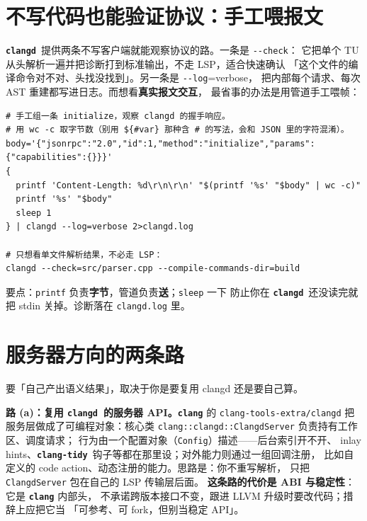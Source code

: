 \documentclass[12pt,a4paper,fontset=fandol]{ctexbook}
\newcommand{\Opt}[1]{\texttt{-\/-#1}}
\newcommand{\Lib}[1]{\textbf{\texttt{#1}}}
\newcommand{\Tidy}{\Lib{clang-tidy}}
\newcommand{\CD}{\Lib{clangd}}
\begin{document}
\section{不写代码也能验证协议：手工喂报文}\label{sec:ch08-s2}

\CD\ 提供两条不写客户端就能观察协议的路。一条是 \Opt{check}：
它把单个 TU 从头解析一遍并把诊断打到标准输出，不走 LSP，适合快速确认
「这个文件的编译命令对不对、头找没找到」。另一条是 \Opt{log}=verbose，
把内部每个请求、每次 AST 重建都写进日志。而想看\textbf{真实报文交互}，
最省事的办法是用管道手工喂帧：

\begin{lstlisting}[style=shellstyle,caption={用 printf 造 Content-Length 头，从管道喂一条 initialize 给 clangd},label={lst:ch08-pipe}]
# 手工组一条 initialize，观察 clangd 的握手响应。
# 用 wc -c 取字节数（别用 ${#var} 那种含 # 的写法，会和 JSON 里的字符混淆）。
body='{"jsonrpc":"2.0","id":1,"method":"initialize","params":{"capabilities":{}}}'
{
  printf 'Content-Length: %d\r\n\r\n' "$(printf '%s' "$body" | wc -c)"
  printf '%s' "$body"
  sleep 1
} | clangd --log=verbose 2>clangd.log

# 只想看单文件解析结果，不必走 LSP：
clangd --check=src/parser.cpp --compile-commands-dir=build
\end{lstlisting}

要点：\texttt{printf} 负责\textbf{字节}，管道负责\textbf{送}；\texttt{sleep} 一下
防止你在 \CD\ 还没读完就把 stdin 关掉。诊断落在 \texttt{clangd.log} 里。

\section{服务器方向的两条路}\label{sec:ch08-s3}

要「自己产出语义结果」，取决于你是要复用 clangd 还是要自己算。

\textbf{路 (a)：复用 \CD\ 的服务器 API。}\Lib{clang} 的
\texttt{clang-tools-extra/clangd} 把服务层做成了可编程对象：核心类
\texttt{clang::clangd::ClangdServer} 负责持有工作区、调度请求；
行为由一个配置对象（\texttt{Config}）描述——后台索引开不开、
inlay hints、\Tidy\ 钩子等都在那里设；对外能力则通过一组回调注册，
比如自定义的 code action、动态注册的能力。思路是：你不重写解析，
只把 \texttt{ClangdServer} 包在自己的 LSP 传输层后面。
\textbf{这条路的代价是 ABI 与稳定性}：它是 \Lib{clang} 内部头，
不承诺跨版本接口不变，跟进 LLVM 升级时要改代码；措辞上应把它当
「可参考、可 fork，但别当稳定 API」。
\end{document}
